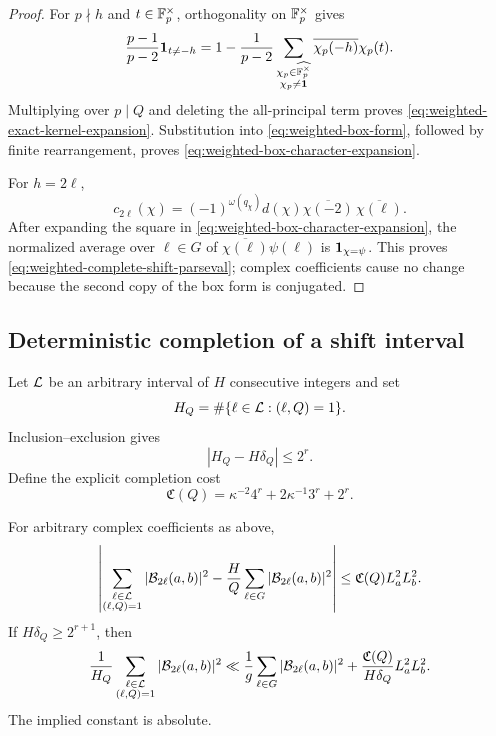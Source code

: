 \begin{proof}
For $p\nmid h$ and $t\in\mathbb F_p^\times$, orthogonality on
$\mathbb F_p^\times$ gives
\[
 \frac{p-1}{p-2}\mathbf 1_{t\ne-h}
 =1-\frac1{p-2}
 \sum_{\substack{\chi_p\in\widehat{\mathbb F_p^\times}\\
                   \chi_p\ne\mathbf 1}}
 \overline{\chi_p(-h)}\chi_p(t).
\]
Multiplying over $p\mid Q$ and deleting the all-principal term proves
\eqref{eq:weighted-exact-kernel-expansion}.  Substitution into
\eqref{eq:weighted-box-form}, followed by finite rearrangement, proves
\eqref{eq:weighted-box-character-expansion}.

For $h=2\ell$,
\[
 c_{2\ell}(\chi)
 =(-1)^{\omega(q_\chi)}d(\chi)
   \overline{\chi(-2)}\,\overline{\chi(\ell)}.
\]
After expanding the square in
\eqref{eq:weighted-box-character-expansion}, the normalized average over
$\ell\in G$ of $\overline{\chi(\ell)}\psi(\ell)$ is
$\mathbf 1_{\chi=\psi}$.  This proves
\eqref{eq:weighted-complete-shift-parseval}; complex coefficients cause no
change because the second copy of the box form is conjugated.
\end{proof}

\subsection{Deterministic completion of a shift interval}

Let $\mathcal L$ be an arbitrary interval of $H$ consecutive integers and set
\begin{equation}\label{eq:weighted-shift-interval-count}
 H_Q=\#\{\ell\in\mathcal L:(\ell,Q)=1\}.
\end{equation}
Inclusion--exclusion gives
\begin{equation}\label{eq:weighted-HQ-discrepancy}
 |H_Q-H\delta_Q|\leq2^r.
\end{equation}
Define the explicit completion cost
\begin{equation}\label{eq:weighted-completion-cost}
 \mathfrak C(Q)
 =\kappa^{-2}4^r+2\kappa^{-1}3^r+2^r.
\end{equation}

\begin{proposition}
\label{prop:weighted-shift-completion}
For arbitrary complex coefficients as above,
\begin{align}
 \left|
 \sum_{\substack{\ell\in\mathcal L\\(\ell,Q)=1}}
 |\mathcal B_{2\ell}(a,b)|^2
 -\frac HQ\sum_{\ell\in G}|\mathcal B_{2\ell}(a,b)|^2
 \right|
 \leq \mathfrak C(Q)L_a^2L_b^2.
 \label{eq:weighted-shift-completion}
\end{align}
If $H\delta_Q\geq2^{r+1}$, then
\begin{align}
 \frac1{H_Q}
 \sum_{\substack{\ell\in\mathcal L\\(\ell,Q)=1}}
 |\mathcal B_{2\ell}(a,b)|^2
 \ll
 \frac1g\sum_{\ell\in G}|\mathcal B_{2\ell}(a,b)|^2
 +\frac{\mathfrak C(Q)}{H\delta_Q}L_a^2L_b^2.
 \label{eq:weighted-short-shift-transfer}
\end{align}
The implied constant is absolute.
\end{proposition}


